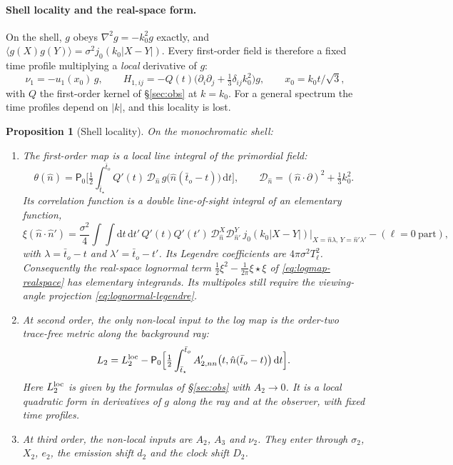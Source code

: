 \documentclass[11pt]{article}
\newtheorem{proposition}[theorem]{Proposition}
\theoremstyle{definition}
\theoremstyle{remark}
\newcommand{\nh}{\hat n}
\newcommand{\dd}{\mathrm{d}}
\newcommand{\ens}[1]{\langle #1\rangle}
\begin{document}
\paragraph{Shell locality and the real-space form.}
On the shell, $g$ obeys $\nabla^2g=-k_0^2g$ exactly, and
$\ens{g(X)g(Y)}=\sigma^2j_0(k_0|X-Y|)$. Every first-order field is therefore a fixed time
profile multiplying a \emph{local} derivative of $g$:
\[
\nu_1=-u_1(x_0)\,g,\qquad H_{1,ij}=-Q(t)\Big(\partial_i\partial_j+\tfrac13\delta_{ij}k_0^2\Big)g,
\qquad x_0=k_0t/\sqrt3,
\]
with $Q$ the first-order kernel of \S\ref{sec:obs} at $k=k_0$. For a general spectrum the
time profiles depend on $|k|$, and this locality is lost.

\begin{proposition}[Shell locality]\label{prop:shell-local}
On the monochromatic shell:
\begin{enumerate}
\item The first-order map is a local line integral of the primordial field:
  \[
  \theta(\nh)=\mathsf P_0\Big[\tfrac12\int_{\bar t_\star}^{\bar t_o}Q'(t)\,\mathcal D_{\nh}\,
  g\big(\nh(\bar t_o-t)\big)\,\dd t\Big],\qquad
  \mathcal D_{\nh}=(\nh\cdot\partial)^2+\tfrac13k_0^2 .
  \]
  Its correlation function is a double line-of-sight integral of an elementary function,
  \begin{equation}\label{eq:xi-shell}
  \xi(\nh\cdot\nh')=\frac{\sigma^2}{4}\int\!\!\int\dd t\,\dd t'\,Q'(t)Q'(t')\,
  \mathcal D^X_{\nh}\mathcal D^Y_{\nh'}\,j_0(k_0|X-Y|)\Big|_{X=\nh\lambda,\,Y=\nh'\lambda'}
  -(\ell=0\ \text{part}),
  \end{equation}
  with $\lambda=\bar t_o-t$ and $\lambda'=\bar t_o-t'$. Its Legendre coefficients are
  $4\pi\sigma^2T_\ell^2$. Consequently the real-space lognormal term
  $\frac12\xi^2-\frac1{2\pi}\xi\star\xi$ of \eqref{eq:logmap-realspace} has elementary
  integrands. Its multipoles still require the viewing-angle projection
  \eqref{eq:lognormal-legendre}.
\item At second order, the \emph{only} non-local input to the log map is the order-two
  trace-free metric along the background ray:
  \[
  L_2=L_2^{\rm loc}-\mathsf P_0\Big[\tfrac12\int_{\bar t_\star}^{\bar t_o}A_{2,nn}'\big(t,\nh(\bar t_o-t)\big)\,\dd t\Big].
  \]
  Here $L_2^{\rm loc}$ is given by the formulas of \S\ref{sec:obs} with $A_2\to0$. It is a
  local quadratic form in derivatives of $g$ along the ray and at the observer, with fixed
  time profiles.
\item At third order, the non-local inputs are $A_2$, $A_3$ and $\nu_2$. They enter through
  $\sigma_2$, $X_2$, $e_2$, the emission shift $d_2$ and the clock shift $D_2$.
\end{enumerate}
\end{proposition}
\end{document}
